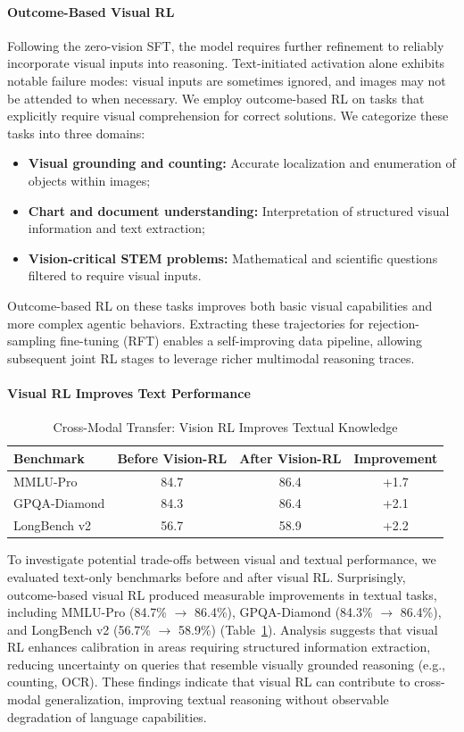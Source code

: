 \documentclass{article}
\begin{document}
\paragraph{Outcome-Based Visual RL}
Following the zero-vision SFT, the model requires further refinement to reliably incorporate visual inputs into reasoning. Text-initiated activation alone exhibits notable failure modes: visual inputs are sometimes ignored, and images may not be attended to when necessary. We employ outcome-based RL on tasks that explicitly require visual comprehension for correct solutions.
We categorize these tasks into three domains:
 \begin{itemize}
 \item \textbf{Visual grounding and counting:} Accurate localization and enumeration of objects within images;
 \item \textbf{Chart and document understanding:} Interpretation of structured visual information and text extraction;
 \item \textbf{Vision-critical STEM problems:} Mathematical and scientific questions filtered to require visual inputs.
 \end{itemize}
Outcome-based RL on these tasks improves both basic visual capabilities and more complex agentic behaviors. Extracting these trajectories for rejection-sampling fine-tuning (RFT) enables a self-improving data pipeline, allowing subsequent joint RL stages to leverage richer multimodal reasoning traces.

\paragraph{Visual RL Improves Text Performance}

\begin{table}[h]
\centering
\caption{Cross-Modal Transfer: Vision RL Improves Textual Knowledge}
\begin{tabular}{lccc}
\toprule
\textbf{Benchmark} & \textbf{Before Vision-RL} & \textbf{After Vision-RL} & \textbf{Improvement} \\
\midrule
MMLU-Pro & 84.7 & 86.4 & +1.7 \\
GPQA-Diamond & 84.3 & 86.4 & +2.1 \\
LongBench v2 & 56.7 & 58.9 & +2.2 \\
\bottomrule
\end{tabular}
\label{tab:vision_rl_text}
\end{table}

 To investigate potential trade-offs between visual and textual performance, we evaluated text-only benchmarks before and after visual RL. Surprisingly, outcome-based visual RL produced measurable improvements in textual tasks, including MMLU-Pro (84.7\% $\rightarrow$ 86.4\%), GPQA-Diamond (84.3\% $\rightarrow$ 86.4\%), and LongBench v2 (56.7\% $\rightarrow$ 58.9\%) (Table~\ref{tab:vision_rl_text}).
Analysis suggests that visual RL enhances calibration in areas requiring structured information extraction, reducing uncertainty on queries that resemble visually grounded reasoning (e.g., counting, OCR). These findings indicate that visual RL can contribute to cross-modal generalization, improving textual reasoning without observable degradation of language capabilities.
\end{document}
